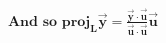 \documentclass[preview]{standalone}
\begin{document}
\begin{align*}
\textbf{And so} \,\, \textbf{proj}_{\mathbf{L}}\mathbf{\vec{y}} = \frac{\mathbf{\vec{y}} \cdot \mathbf{\vec{u}}}{\mathbf{\vec{u}} \cdot \mathbf{\vec{u}}} \mathbf{\vec{u}}
\end{align*}
\end{document}
